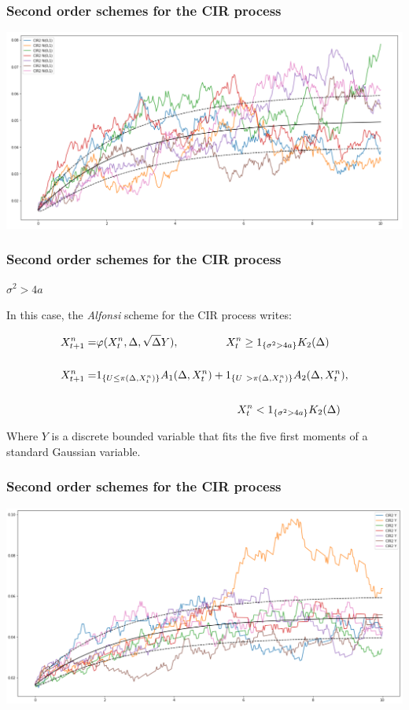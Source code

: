 \documentclass[12pt]{beamer}
\begin{document}
\begin{frame}
	\frametitle{Second order schemes for the CIR process}
	\centering
	\includegraphics[width=\textwidth]{paths_cir2_N.png}
\end{frame}

\begin{frame}
\frametitle{Second order schemes for the CIR process}
\textbf{\Large{$\sigma^2 > 4a$}}
\vspace{0.5cm}

In this case, the \textit{Alfonsi} scheme for the CIR process writes:

\begin{align*}
	 X_{t + 1}^n =& \varphi(X_t^n, \Delta, \sqrt{\Delta}Y), \hspace{1.5cm} X_t^n \geq 1_{\{\sigma^2 > 4a \}}K_2(\Delta)\\
	 \\
     X_{t + 1}^n =& 1_{\{U \leq \pi(\Delta, X_t^n)\}}A_1(\Delta, X_t^n) + 1_{\{U \ > \pi(\Delta, X_t^n)\}}A_2(\Delta, X_t^n), \\
     \\
                  & \hspace{4.5cm}X_t^n < 1_{\{\sigma^2 > 4a \}}K_2(\Delta)
\end{align*}

Where $Y$ is a discrete bounded variable that fits the five first moments of a standard Gaussian variable.
\end{frame}

\begin{frame}
	\frametitle{Second order schemes for the CIR process}
	\centering
	\includegraphics[width=\textwidth]{paths_cir2_Y.png}
\end{frame}
\end{document}
